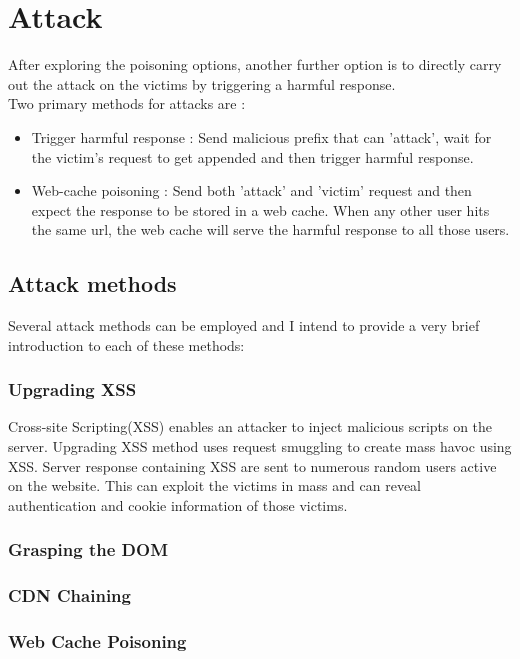 \section{Attack}
After exploring the poisoning options, another further option is to directly carry out the attack on the victims by triggering a harmful response. \\
Two primary methods for attacks are :
\begin{itemize}
	\item Trigger harmful response : Send malicious prefix that can 'attack', wait for the victim's request to get appended and then trigger harmful response. 
	\item Web-cache poisoning : Send both 'attack' and 'victim' request and then expect the response to be stored in a web cache. When any other user hits the same url, the web cache will serve the harmful response to all those users. 
\end{itemize}

\subsection{Attack methods}
Several attack methods can be employed and I intend to provide a very brief introduction to each of these methods:
\subsubsection{Upgrading XSS}
Cross-site Scripting(XSS) \cite{b11} enables an attacker to inject malicious scripts on the server. Upgrading XSS method uses request smuggling to create mass havoc using XSS. Server response containing XSS are sent to numerous random users active on the website. This can exploit the victims in mass and can reveal authentication and cookie information of those victims.  
\subsubsection{Grasping the DOM}

\subsubsection{CDN Chaining}

\subsubsection{Web Cache Poisoning}